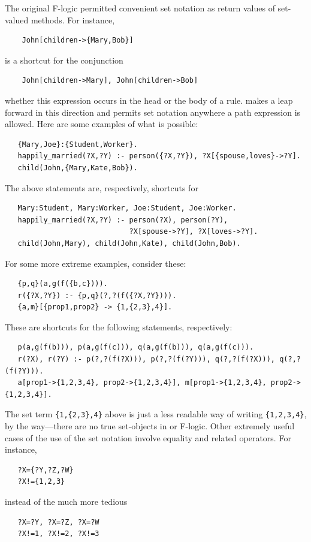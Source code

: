 \documentclass[11pt]{article}
\newcommand{\ERGO}{\mbox{\smaller{\ensuremath{\cal{E}}\smaller{{\sc{RGO}}}}}\xspace}
\newcommand{\FLSYSTEM}{\ERGO}
\begin{document}
The original F-logic \cite{KLW95} permitted convenient set notation as
return values of set-valued methods. For instance,
\begin{verbatim}
    John[children->{Mary,Bob}]
\end{verbatim}
is a shortcut for the conjunction
\begin{verbatim}
    John[children->Mary], John[children->Bob]
\end{verbatim}
whether this expression occurs in the head or the body of a rule. \FLSYSTEM
makes a leap forward in this direction and permits set notation anywhere a
path expression is allowed. Here are some examples of what is possible:
\begin{verbatim}
   {Mary,Joe}:{Student,Worker}.
   happily_married(?X,?Y) :- person({?X,?Y}), ?X[{spouse,loves}->?Y].
   child(John,{Mary,Kate,Bob}).
\end{verbatim}
The above statements are, respectively, shortcuts for 
\begin{verbatim}
   Mary:Student, Mary:Worker, Joe:Student, Joe:Worker.
   happily_married(?X,?Y) :- person(?X), person(?Y),
                             ?X[spouse->?Y], ?X[loves->?Y].
   child(John,Mary), child(John,Kate), child(John,Bob).
\end{verbatim}
For some more extreme examples, consider these:
\begin{verbatim}
   {p,q}(a,g(f({b,c}))).
   r({?X,?Y}) :- {p,q}(?,?(f({?X,?Y}))).
   {a,m}[{prop1,prop2} -> {1,{2,3},4}].
\end{verbatim}
These are shortcuts for the following statements, respectively:
\begin{verbatim}
   p(a,g(f(b))), p(a,g(f(c))), q(a,g(f(b))), q(a,g(f(c))).
   r(?X), r(?Y) :- p(?,?(f(?X))), p(?,?(f(?Y))), q(?,?(f(?X))), q(?,?(f(?Y))).
   a[prop1->{1,2,3,4}, prop2->{1,2,3,4}], m[prop1->{1,2,3,4}, prop2->{1,2,3,4}].
\end{verbatim}
The set term \texttt{\{1,\{2,3\},4\}} above is just a less readable way of
writing \texttt{\{1,2,3,4\}}, by the way---there are no true set-objects in
\FLSYSTEM or F-logic.
Other extremely useful cases of the use of the set notation involve equality and related
operators. For instance,
\begin{verbatim}
   ?X={?Y,?Z,?W}
   ?X!={1,2,3}
\end{verbatim}
instead of the much more tedious
\begin{verbatim}
   ?X=?Y, ?X=?Z, ?X=?W
   ?X!=1, ?X!=2, ?X!=3
\end{verbatim}
\end{document}
